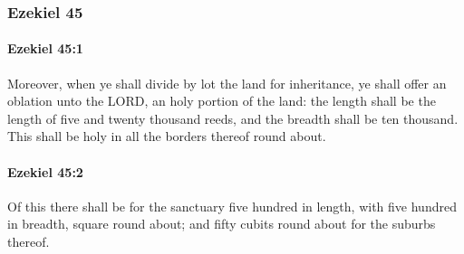 	\subsubsection{Ezekiel 45} %
		\label{EZEKIEL-45}

		\paragraph{Ezekiel 45:1} %
			\label{EZEKIEL-45-1}

			Moreover, when ye shall divide by lot the land for inheritance, ye shall offer an oblation unto the LORD, an holy portion of the land: the length shall be the length of five and twenty thousand reeds, and the breadth shall be ten thousand. This shall be holy in all the borders thereof round about.


		\paragraph{Ezekiel 45:2} %
			\label{EZEKIEL-45-2}

			Of this there shall be for the sanctuary five hundred in length, with five hundred in breadth, square round about; and fifty cubits round about for the suburbs thereof.

